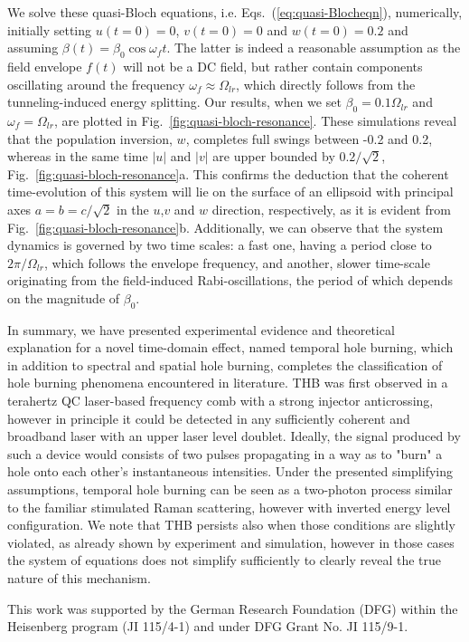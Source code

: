 \documentclass[reprint,secnumarabic,amssymb, nobibnotes, aip, prd]{revtex4-1}
\newcommand{\vspacec}{\vspace{-0.3cm}}
\begin{document}
\vspacec
We solve these quasi-Bloch equations, i.e. Eqs.~(\ref{eq:quasi-Blocheqn}), numerically, initially setting $u(t=0)=0$, $v(t=0) = 0$ and $w(t=0) = 0.2$ and assuming $\beta(t) = \beta_0 \cos\omega_f t$. The latter is indeed a reasonable assumption as the field envelope $f(t)$ will not be a DC field, but rather contain components oscillating around the frequency $\omega_f \approx \Omega_{lr}$, which directly follows from the tunneling-induced energy splitting. Our results, when we set $\beta_0 = 0.1\Omega_{lr}$ and $\omega_f = \Omega_{lr}$, are plotted in Fig.~\ref{fig:quasi-bloch-resonance}. These simulations reveal that the population inversion, $w$, completes full swings between -0.2 and 0.2, whereas in the same time $|u|$ and $|v|$ are upper bounded by $0.2/\sqrt{2}$, Fig.~\ref{fig:quasi-bloch-resonance}a. This confirms the deduction that the coherent time-evolution of this system will lie on the surface of an ellipsoid with principal axes $a=b=c/\sqrt{2}$ in the $u$,$v$ and $w$ direction, respectively, as it is evident from Fig.~\ref{fig:quasi-bloch-resonance}b. Additionally, we can observe that the system dynamics is governed by two time scales: a fast one, having a period close to $2\pi/\Omega_{lr}$, which follows the envelope frequency, and another, slower time-scale originating from the field-induced Rabi-oscillations, the period of which depends on the magnitude of $\beta_0$.  

In summary, we have presented experimental evidence and theoretical explanation for a novel time-domain effect, named temporal hole burning, which in addition to spectral and spatial hole burning, completes the classification of hole burning phenomena encountered in  literature. THB was first observed in a terahertz QC laser-based frequency comb with a strong injector anticrossing\cite{burghoff2015evaluating}, however in principle it could be detected in any sufficiently coherent and broadband laser with an upper laser level doublet. Ideally, the signal produced by such a device would consists of two pulses propagating in a way as to "burn" a hole onto each other's instantaneous intensities. Under the presented simplifying assumptions, temporal hole burning can be seen as a two-photon process similar to the familiar stimulated Raman scattering, however with inverted energy level configuration. We note that THB persists also when those conditions are slightly violated, as already shown by experiment\cite{burghoff2015evaluating} and simulation\cite{petz2016}, however in those cases the system of equations does not simplify sufficiently to clearly reveal the true nature of this mechanism. 

This work was supported by the German Research Foundation (DFG) within the Heisenberg program (JI 115/4-1) and under DFG Grant No. JI 115/9-1.

\end{document}
